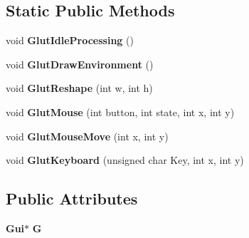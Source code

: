 \subsection*{Static Public Methods}
\begin{CompactItemize}
\item 
void {\bf Glut\-Idle\-Processing} ()
\item 
void {\bf Glut\-Draw\-Environment} ()
\item 
void {\bf Glut\-Reshape} (int w, int h)
\item 
void {\bf Glut\-Mouse} (int button, int state, int x, int y)
\item 
void {\bf Glut\-Mouse\-Move} (int x, int y)
\item 
void {\bf Glut\-Keyboard} (unsigned char Key, int x, int y)
\end{CompactItemize}
\subsection*{Public Attributes}
\begin{CompactItemize}
\item 
{\bf Gui}$\ast$ {\bf G}
\end{CompactItemize}
